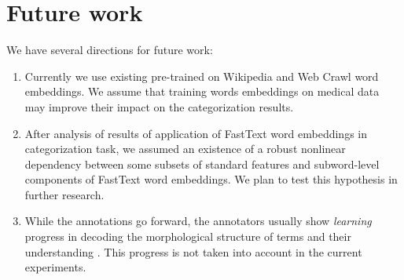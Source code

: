 \section{Future work}
We have several directions for future work:
\begin{enumerate}
    \item Currently we use existing pre-trained on Wikipedia and Web Crawl word embeddings. We assume that training words embeddings on medical data may improve their impact on the categorization results.
    
    \item After analysis of results of application of FastText word embeddings in categorization task, we assumed an existence of a robust nonlinear dependency between some subsets of standard features and subword-level components of FastText word embeddings. We plan to test this hypothesis in further research.
    
    \item While the annotations go forward, the annotators usually show {\it learning} progress in decoding the morphological structure of terms and their understanding \citep{Grabar-BIONLP2017}. This progress is not taken into account in the current experiments. 
\end{enumerate}
